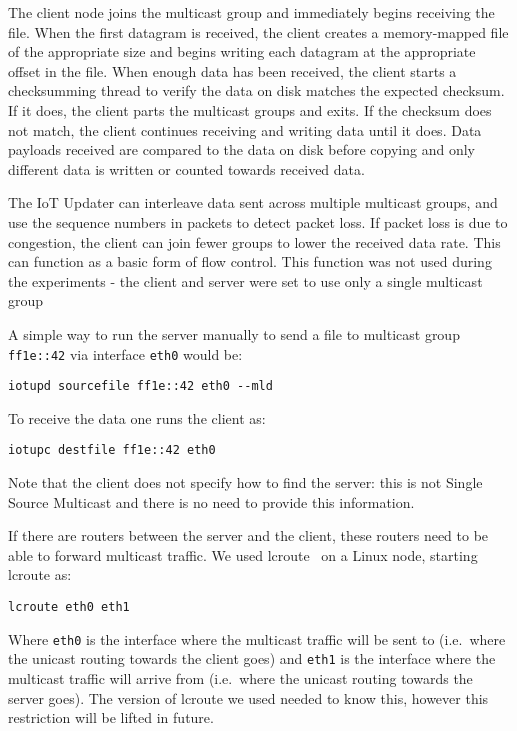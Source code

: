 \documentclass[a4paper,11pt,twocolumn]{article}
\begin{document}
The client node joins the multicast group and immediately begins receiving
the file.  When the first datagram is received, the client creates a
memory-mapped file of the appropriate size and begins writing each datagram at
the appropriate offset in the file.  When enough data has been received, the
client starts a checksumming thread to verify the data on disk matches the
expected checksum.  If it does, the client parts the multicast groups and exits.
If the checksum does not match, the client continues receiving and writing data
until it does.  Data payloads received are compared to the data on disk before
copying and only different data is written or counted towards received data.

The IoT Updater can interleave data sent across multiple multicast groups, and
use the sequence numbers in packets to detect packet loss.  If packet loss is
due to congestion, the client can join fewer groups to lower the received data
rate.  This can function as a basic form of flow control.  This function was not
used during the experiments - the client and server were set to use only a
single multicast group

A simple way to run the server manually to send a file to multicast
group {\tt ff1e::42} via interface {\tt eth0} would be:

\begin{verbatim}
iotupd sourcefile ff1e::42 eth0 --mld
\end{verbatim}

To receive the data one runs the client as:

\begin{verbatim}
iotupc destfile ff1e::42 eth0
\end{verbatim}

Note that the client does not specify how to find the server: this is
not Single Source Multicast and there is no need to provide this
information.

If there are routers between the server and the client, these routers need to
be able to forward multicast traffic.  We used lcroute~\cite{lcroute:sources}
on a Linux node, starting lcroute as:

\begin{verbatim}
lcroute eth0 eth1
\end{verbatim}

Where {\tt eth0} is the interface where the multicast traffic will be
sent to (i.e.\ where the unicast routing towards the client goes)
and {\tt eth1} is the interface where the multicast traffic will arrive
from (i.e.\ where the unicast routing towards the server goes). The
version of lcroute we used needed to know this, however this restriction
will be lifted in future.
\end{document}
